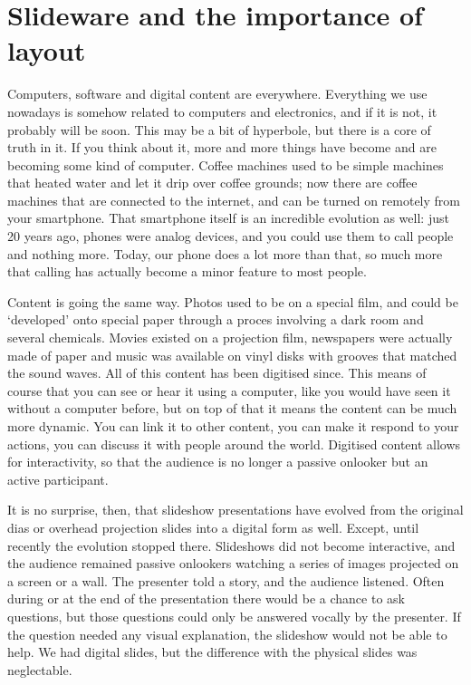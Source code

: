 
 \chapter{Slideware and the importance of layout}

  Computers, software and digital content are everywhere. Everything we use
  nowadays is somehow related to computers and electronics, and if it is not, it
  probably will be soon. This may be a bit of hyperbole, but there is a core of
  truth in it. If you think about it, more and more things have become and are
  becoming some kind of computer. Coffee machines used to be simple machines
  that heated water and let it drip over coffee grounds; now there are coffee
  machines that are connected to the internet, and can be turned on remotely
  from your smartphone. That smartphone itself is an incredible evolution as
  well: just 20 years ago, phones were analog devices, and you could use them
  to call people and nothing more. Today, our phone does a lot more than that,
  so much more that calling has actually become a minor feature to most people.

  Content is going the same way. Photos used to be on a special film, and could
  be `developed' onto special paper through a proces involving a dark room and
  several chemicals. Movies existed on a projection film, newspapers were
  actually made of paper and music was available on vinyl disks with grooves
  that matched the sound waves. All of this content has been digitised since.
  This means of course that you can see or hear it using a computer, like you
  would have seen it without a computer before, but on top of that it means the
  content can be much more dynamic. You can link it to other content, you can
  make it respond to your actions, you can discuss it with people around the
  world. Digitised content allows for interactivity, so that the audience is no
  longer a passive onlooker but an active participant.

  It is no surprise, then, that slideshow presentations have evolved from the
  original dias or overhead projection slides into a digital form as well.
  Except, until recently the evolution stopped there. Slideshows did not become
  interactive, and the audience remained passive onlookers watching a series of
  images projected on a screen or a wall. The presenter told a story, and the
  audience listened. Often during or at the end of the presentation there would
  be a chance to ask questions, but those questions could only be answered
  vocally by the presenter. If the question needed any visual explanation, the
  slideshow would not be able to help. We had digital slides, but the
  difference with the physical slides was neglectable.

